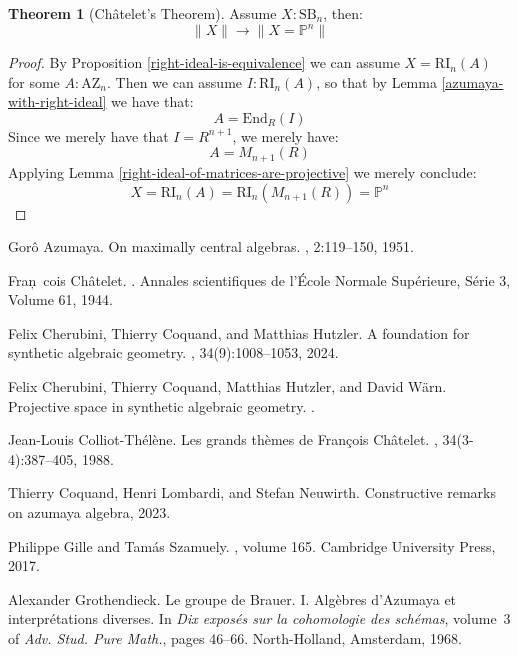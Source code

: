 \documentclass[10pt,a4paper]{article}
\theoremstyle{definition}
\newtheorem{theorem}{Theorem}[section]
\newcommand{\SB}{\mathrm{SB}}
\newcommand{\RI}{\mathrm{RI}}
\newcommand{\AZ}{\mathrm{AZ}}
\newcommand{\propTrunc}[1]{\lVert #1 \rVert}
\newcommand{\bP}{\mathbb{P}}
\begin{document}
\begin{theorem}[Ch\^atelet's Theorem]\label{chatelet-theorem}
Assume $X:\SB_n$, then:
\[\propTrunc{X}\to\propTrunc{X=\bP^n}\]
\end{theorem}

\begin{proof}
By Proposition \ref{right-ideal-is-equivalence} we can assume $X=\RI_n(A)$ for some $A:\AZ_n$. Then we can assume $I:\RI_n(A)$, so that by Lemma \ref{azumaya-with-right-ideal} we have that:
\[A=\mathrm{End}_R(I)\]
Since we merely have that $I=R^{n+1}$, we merely have:
\[A = M_{n+1}(R)\]
Applying Lemma \ref{right-ideal-of-matrices-are-projective} we merely conclude:
\[X=\RI_n(A)=\RI_n(M_{n+1}(R)) = \bP^n\]
\end{proof}

\begin{thebibliography}{10}

Gor\^o Azumaya.
\newblock On maximally central algebras.
, 2:119--150, 1951.

Fran\c~cois Ch\^atelet.
.
\newblock Annales scientifiques de l'\'Ecole Normale Sup\'erieure, S\'erie 3,
  Volume 61, 1944.

Felix {Cherubini}, Thierry {Coquand}, and Matthias {Hutzler}.
\newblock A foundation for synthetic algebraic geometry.
, 34(9):1008--1053,
  2024.

Felix Cherubini, Thierry Coquand, Matthias Hutzler, and David Wärn.
\newblock Projective space in synthetic algebraic geometry.
.

Jean-Louis Colliot-Th\'el\`ene.
\newblock Les grands th\`emes de {F}ran\c cois {C}h\^atelet.
, 34(3-4):387--405, 1988.

Thierry Coquand, Henri Lombardi, and Stefan Neuwirth.
\newblock Constructive remarks on azumaya algebra, 2023.

Philippe Gille and Tam{\'a}s Szamuely.
, volume 165.
\newblock Cambridge University Press, 2017.

Alexander Grothendieck.
\newblock Le groupe de {B}rauer. {I}. {A}lg\`ebres d'{A}zumaya et
  interpr\'etations diverses.
\newblock In {\em Dix expos\'es sur la cohomologie des sch\'emas}, volume~3 of
  {\em Adv. Stud. Pure Math.}, pages 46--66. North-Holland, Amsterdam, 1968.


\end{thebibliography}
\end{document}
